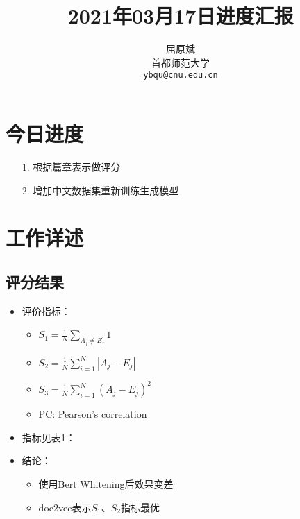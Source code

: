 \documentclass[11pt]{article}
\title{2021年03月17日进度汇报}
\author{屈原斌 \\
  首都师范大学 \\
    {\tt ybqu@cnu.edu.cn}}
\date{}
\begin{document}
\begin{CJK}{UTF8}{gkai}

\maketitle
\CJKindent


\section{今日进度}


\begin{itemize}
\item [1.] 根据篇章表示做评分
\item [2.] 增加中文数据集重新训练生成模型
\end{itemize}

\section{工作详述}
\subsection{评分结果}

\begin{itemize}
  \item 评价指标：
  \begin{itemize}
    \item $S_1 = \frac{1}{N} \sum_{A_{j} \neq E_{j}^{\prime}} 1$
    \item $S_2 = \frac{1}{N} \sum_{i=1}^{N} \left| A_j-E_j\right|$
    \item $S_3 = \frac{1}{N} \sum_{i=1}^{N} \left(A_j-E_j\right)^2$
    \item PC: Pearson’s correlation
  \end{itemize}
  \item 指标见表1：
  \item 结论：
  \begin{itemize}
    \item 使用Bert Whitening后效果变差
    \item doc2vec表示$S_1$、$S_2$指标最优
  \end{itemize}
\end{itemize}


\end{CJK}
\end{document}
